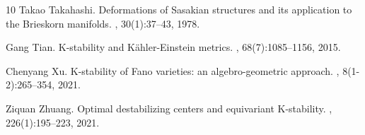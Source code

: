 \documentclass[12pt]{amsart}
\theoremstyle{definition}
\theoremstyle{remark}
\begin{document}
\begin{thebibliography}{10}
Takao Takahashi.
\newblock Deformations of {S}asakian structures and its application to the
  {B}rieskorn manifolds.
, 30(1):37--43, 1978.

Gang Tian.
\newblock K-stability and {K}\"ahler-{E}instein metrics.
, 68(7):1085--1156, 2015.

Chenyang Xu.
\newblock K-stability of {F}ano varieties: an algebro-geometric approach.
, 8(1-2):265--354, 2021.

Ziquan Zhuang.
\newblock Optimal destabilizing centers and equivariant {K}-stability.
, 226(1):195--223, 2021.

\end{thebibliography}
\end{document}
